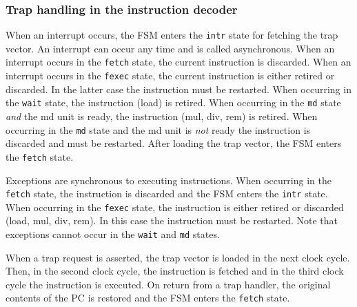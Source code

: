 \documentclass[12pt]{article}
\begin{document}
\subsubsection{Trap handling in the instruction decoder}
When an interrupt occurs, the FSM enters the \texttt{intr} state for fetching the trap vector. An interrupt can occur any time and is called asynchronous. When an interrupt occurs in the \texttt{fetch} state, the current instruction is discarded. When an interrupt occurs in the \texttt{fexec} state, the current instruction is either retired or discarded. In the latter case the instruction must be restarted. When occurring in the \texttt{wait} state, the instruction (load) is retired. When occurring in the \texttt{md} state \emph{and} the md unit is ready, the instruction (mul, div, rem) is retired. When occurring in the \texttt{md} state and the md unit is \emph{not} ready the instruction is discarded and must be restarted. After loading the trap vector, the FSM enters the \texttt{fetch} state.

Exceptions are synchronous to executing instructions. When occurring in the \texttt{fetch} state, the instruction is discarded and the FSM enters the \texttt{intr} state. When occurring in the \texttt{fexec} state, the instruction is either retired or discarded (load, mul, div, rem). In this case the instruction must be restarted. Note that exceptions cannot occur in the \texttt{wait} and \texttt{md} states.

When a trap request is asserted, the trap vector is loaded in the next clock cycle. Then, in the second clock cycle, the instruction is fetched and in the third clock cycle the instruction is executed. On return from a trap handler, the original contents of the PC is restored and the FSM enters the \texttt{fetch} state.

\end{document}
